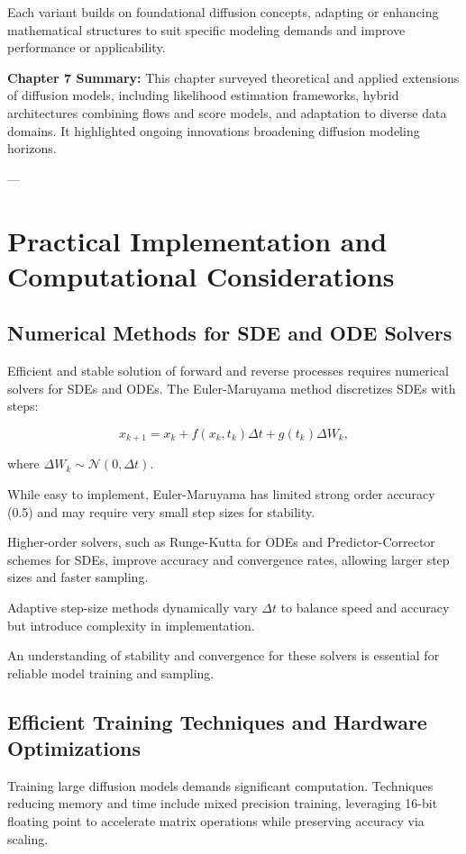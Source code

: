 Each variant builds on foundational diffusion concepts, adapting or enhancing mathematical structures to suit specific modeling demands and improve performance or applicability.

\textbf{Chapter 7 Summary:}  
This chapter surveyed theoretical and applied extensions of diffusion models, including likelihood estimation frameworks, hybrid architectures combining flows and score models, and adaptation to diverse data domains. It highlighted ongoing innovations broadening diffusion modeling horizons.

---

\chapter{Practical Implementation and Computational Considerations}

\section{Numerical Methods for SDE and ODE Solvers}

Efficient and stable solution of forward and reverse processes requires numerical solvers for SDEs and ODEs. The Euler-Maruyama method discretizes SDEs with steps:

\[
x_{k+1} = x_k + f(x_k, t_k) \Delta t + g(t_k) \Delta W_k,
\]

where \( \Delta W_k \sim \mathcal{N}(0, \Delta t) \).

While easy to implement, Euler-Maruyama has limited strong order accuracy (0.5) and may require very small step sizes for stability.

Higher-order solvers, such as Runge-Kutta for ODEs and Predictor-Corrector schemes for SDEs, improve accuracy and convergence rates, allowing larger step sizes and faster sampling.

Adaptive step-size methods dynamically vary \( \Delta t \) to balance speed and accuracy but introduce complexity in implementation.

An understanding of stability and convergence for these solvers is essential for reliable model training and sampling.

\section{Efficient Training Techniques and Hardware Optimizations}

Training large diffusion models demands significant computation. Techniques reducing memory and time include mixed precision training, leveraging 16-bit floating point to accelerate matrix operations while preserving accuracy via scaling.


